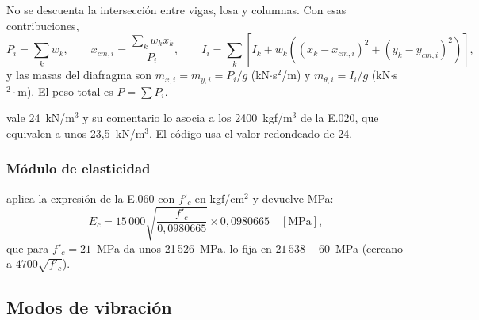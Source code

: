No se descuenta la intersección entre vigas, losa y columnas. Con esas contribuciones,
\begin{equation}
	P_i = \sum_k w_k, \qquad x_{cm,i} = \frac{\sum_k w_k x_k}{P_i}, \qquad
	I_i = \sum_k \left[ I_k + w_k \left( (x_k - x_{cm,i})^2 + (y_k - y_{cm,i})^2 \right) \right],
	\label{eq:sis-pesos}
\end{equation}
y las masas del diafragma son $m_{x,i} = m_{y,i} = P_i/g$ (kN$\cdot$s$^2$/m) y $m_{\theta,i} = I_i/g$
(kN$\cdot$s$^2\cdot$m). El peso total es $P = \sum P_i$.

\begin{nota}
 vale 24~kN/m$^3$ y su comentario lo asocia a los 2400~kgf/m$^3$ de la E.020, que
equivalen a unos 23,5~kN/m$^3$. El código usa el valor redondeado de 24.
\end{nota}

\subsubsection{Módulo de elasticidad}

 aplica la expresión de la E.060 con $f'_c$ en kgf/cm$^2$ y devuelve MPa:
\begin{equation}
	E_c = 15\,000 \sqrt{\frac{f'_c}{0{,}0980665}} \times 0{,}0980665 \quad [\text{MPa}],
	\label{eq:sis-ec}
\end{equation}
que para $f'_c = 21$~MPa da unos 21\,526~MPa.  lo fija en
$21\,538 \pm 60$~MPa (cercano a $4700\sqrt{f'_c}$).

\subsection{Modos de vibración}
\label{sec:sis-modos}

